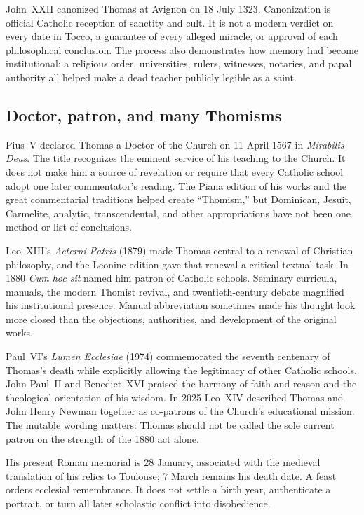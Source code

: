 John~XXII canonized Thomas at Avignon on 18 July 1323.  Canonization is official
Catholic reception of sanctity and cult.  It is not a modern verdict on every
date in Tocco, a guarantee of every alleged miracle, or approval of each
philosophical conclusion.  The process also demonstrates how memory had become
institutional: a religious order, universities, rulers, witnesses, notaries,
and papal authority all helped make a dead teacher publicly legible as a saint.

\subsection{Doctor, patron, and many Thomisms}

Pius~V declared Thomas a Doctor of the Church on 11 April 1567 in
\emph{Mirabilis Deus}.  The title recognizes the eminent service of his
teaching to the Church.  It does not make him a source of revelation or require
that every Catholic school adopt one later commentator's reading.  The Piana
edition of his works and the great commentarial traditions helped create
``Thomism,'' but Dominican, Jesuit, Carmelite, analytic, transcendental, and
other appropriations have not been one method or list of conclusions.

Leo~XIII's \emph{Aeterni Patris} (1879) made Thomas central to a renewal of
Christian philosophy, and the Leonine edition gave that renewal a critical
textual task.  In 1880 \emph{Cum hoc sit} named him patron of Catholic schools.
Seminary curricula, manuals, the modern Thomist revival, and twentieth-century
debate magnified his institutional presence.  Manual abbreviation sometimes
made his thought look more closed than the objections, authorities, and
development of the original works.

Paul~VI's \emph{Lumen Ecclesiae} (1974) commemorated the seventh centenary of
Thomas's death while explicitly allowing the legitimacy of other Catholic
schools.  John Paul~II and Benedict~XVI praised the harmony of faith and reason
and the theological orientation of his wisdom.  In 2025 Leo~XIV described
Thomas and John Henry Newman together as co-patrons of the Church's educational
mission.  The mutable wording matters: Thomas should not be called the sole
current patron on the strength of the 1880 act alone.

His present Roman memorial is 28 January, associated with the medieval
translation of his relics to Toulouse; 7 March remains his death date.  A feast
orders ecclesial remembrance.  It does not settle a birth year, authenticate a
portrait, or turn all later scholastic conflict into disobedience.

